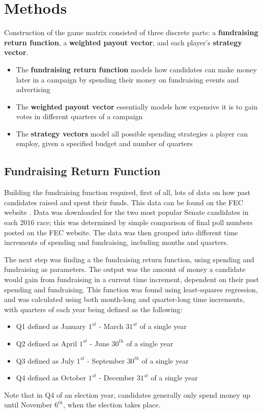 \documentclass[11pt]{article}
\begin{document}
\newpage
\section{Methods}

Construction of the game matrix consisted of three discrete parts: a
\textbf{fundraising return function}, a \textbf{weighted payout vector}, and
each player's \textbf{strategy vector}.
\begin{itemize}
\item The \textbf{fundraising return function} models how candidates can make
money later in a campaign by spending their money on fundraising events and
advertising
\item The \textbf{weighted payout vector} essentially models how expensive it
is to gain votes in different quarters of a campaign
\item The \textbf{strategy vectors} model all possible spending strategies a
player can employ, given a specified budget and number of quarters
\end{itemize}

\subsection{Fundraising Return Function}
Building the fundraising function required, first of all, lots of data on how
past candidates raised and spent their funds. This data can be found on the FEC
website \cite{fec}. Data was downloaded for the two most popular Senate
candidates in each 2016 race; this was determined by simple comparison of final
poll numbers posted on the FEC website. The data was then grouped into
different time increments of spending and fundraising, including months and
quarters.

The next step was finding a the fundraising return function, using spending and
fundraising as parameters. The output was the amount of money a candidate would
gain from fundraising in a current time increment, dependent on their past
spending and fundraising. This function was found using least-squares
regression, and was calculated using both month-long and quarter-long time
increments, with quarters of each year being defined as the following:
\begin{itemize}
\item Q1 defined as January $1^{st}$ - March $31^{st}$ of a single year
\item Q2 defined as April $1^{st}$ - June $30^{th}$ of a single year
\item Q3 defined as July $1^{st}$ - September $30^{th}$ of a single year
\item Q4 defined as October $1^{st}$ - December $31^{st}$ of a single year
\end{itemize}
Note that in Q4 of an election year, candidates generally only spend money up
until November $6^{th}$, when the election takes place.
\end{document}
